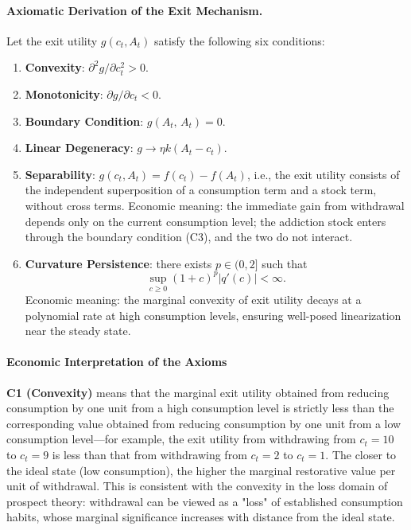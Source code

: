 \documentclass[12pt]{article}
\begin{document}
\paragraph{Axiomatic Derivation of the Exit Mechanism.}
Let the exit utility $g(c_t, A_t)$ satisfy the following six conditions:
\begin{enumerate}[label=(C\arabic*)]
    \item \textbf{Convexity}: $\partial^2 g/\partial c_t^2 > 0$.
    \item \textbf{Monotonicity}: $\partial g/\partial c_t < 0$.
    \item \textbf{Boundary Condition}: $g(A_t,\,A_t) = 0$.
    \item \textbf{Linear Degeneracy}: $g \to \eta k(A_t - c_t)$.
        \item \textbf{Separability}: $g(c_t, A_t) = f(c_t) - f(A_t)$,
          i.e., the exit utility consists of the independent superposition of a consumption term and a stock term, without cross terms.
          Economic meaning: the immediate gain from withdrawal depends only on the current consumption level;
          the addiction stock enters through the boundary condition (C3), and the two do not interact.
        \item \textbf{Curvature Persistence}: there exists $p \in (0,2]$ such that
      \[
      \sup_{c \ge 0} (1+c)^p |q'(c)| < \infty.
      \]
      Economic meaning: the marginal convexity of exit utility decays at a polynomial rate at high consumption levels,
      ensuring well-posed linearization near the steady state.
\end{enumerate}
 \paragraph{Economic Interpretation of the Axioms}
 

\textbf{C1 (Convexity)} means that the marginal exit utility obtained from reducing consumption by one unit from a high consumption level
is strictly less than the corresponding value obtained from reducing consumption by one unit from a low consumption level---for example,
the exit utility from withdrawing from $c_t = 10$ to $c_t = 9$ is less than that from withdrawing from $c_t = 2$ to $c_t = 1$.
The closer to the ideal state (low consumption), the higher the marginal restorative value per unit of withdrawal.
This is consistent with the convexity in the loss domain of prospect theory\cite{Kahneman1979}: withdrawal can be viewed
as a "loss" of established consumption habits, whose marginal significance increases with distance from the ideal state.
 
\end{document}
